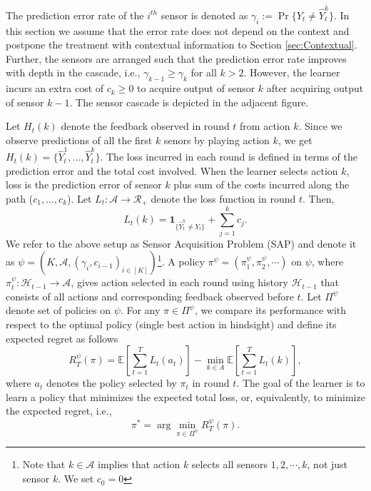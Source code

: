\documentclass{article}
\begin{document}
The prediction error rate of the $i^{th}$ sensor is denoted as $\gamma_i:=\Pr\{Y_t\neq \hat{Y}^k_t\}$. In this section we assume that the error rate does not depend on the  context and postpone the treatment with contextual information to Section \ref{sec:Contextual}. Further, the sensors are arranged such that the prediction error rate improves with depth in the cascade, i.e., $\gamma_{k-1}\geq \gamma_k$ for all $k>2$. However, the learner incurs an extra cost of $c_k\geq 0$ to acquire output of sensor $k$ after acquiring output of sensor $k-1$. The sensor cascade is depicted in the adjacent figure.

Let $H_t(k)$ denote the feedback observed in round $t$ from action $k$. Since we observe predictions of all the first $k$ senors by playing action $k$, we get   $H_t(k)=\{\hat{Y}^1_t,\ldots,\hat{Y}^k_t\}$.
The loss incurred in each round is defined in terms of the prediction error and the total cost involved. When the learner selects action $k$, loss is the prediction error of sensor $k$ plus sum of the costs incurred along the path ($c_1,\ldots,c_k$). Let $L_t: \mathcal{A}\rightarrow \mathcal{R}_+$ denote the loss function in round $t$. Then,
\begin{equation}
L_t(k)=\mathbf{1}_{\{\hat{Y}^k_t\neq Y_t\}}+\sum_{j=1}^k c_j.
\end{equation} 
We refer to the above setup as Sensor Acquisition Problem (SAP) and denote it as $\psi=(K,\mathcal{A}, (\gamma_i,c_{i-1})_{i\in [K]})$\footnote{Note that $k\in \mathcal{A}$ implies that action $k$ selects all sensors ${1, 2, \cdots, k}$, not just sensor $k$. We set $c_0=0$}. A policy $\pi^\psi=(\pi^\psi_1, \pi^\psi_2, \cdots)$ on $\psi$, where  $\pi^\psi_t : \mathcal{H}_{t-1}\rightarrow
\mathcal{A}$, gives action selected in each round using history $\mathcal{H}_{t-1}$ that consists of all actions and corresponding feedback observed before $t$. Let $\Pi^\psi$ denote set of policies on $\psi$. For any $\pi \in \Pi^\psi$, we compare its performance with respect to the optimal policy (single best action in hindsight) and define its expected regret as follows
\begin{equation}
R^\psi_T(\pi)= \mathbb{E}\left[\sum_{t=1}^T L_t(a_t)\right]-\min_{k\in A}\mathbb{E}\left[\sum_{t=1}^T L_t(k)\right],
\end{equation}
where $a_t$ denotes the policy selected by $\pi_t$ in round $t$.
The goal of the learner is to learn a policy that minimizes the expected total loss, or, equivalently, to minimize the expected regret, i.e.,
\begin{equation}
\pi^*= \arg \min_{\pi \in \Pi^\psi } R^\psi_T(\pi).
\end{equation}
\end{document}
